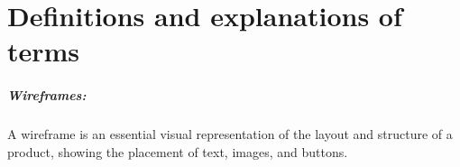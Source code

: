 
\chapter{Definitions and explanations of terms}
\label{appendix:two:definations}
\paragraph{Wireframes:} A wireframe is an essential visual representation of the layout and structure of a product, showing the placement of text, images, and buttons.

